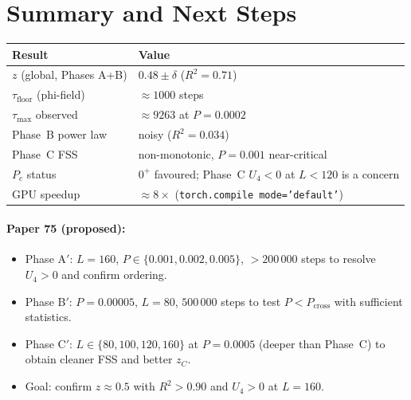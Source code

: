\documentclass[12pt,a4paper]{article}
\begin{document}
\section{Summary and Next Steps}

\begin{center}
\begin{tabular}{ll}
\toprule
\textbf{Result} & \textbf{Value} \\
\midrule
$z$ (global, Phases A+B) & $0.48 \pm \delta$ ($R^2=0.71$) \\
$\tau_\mathrm{floor}$ (phi-field) & $\approx 1000$ steps \\
$\tau_\mathrm{max}$ observed & $\approx 9263$ at $P=0.0002$ \\
Phase~B power law & noisy ($R^2=0.034$) \\
Phase~C FSS & non-monotonic, $P=0.001$ near-critical \\
$P_c$ status & $0^+$ favoured; Phase~C $U_4<0$ at $L<120$ is a concern \\
GPU speedup & $\approx 8\times$ (\texttt{torch.compile mode='default'}) \\
\bottomrule
\end{tabular}
\end{center}

\paragraph{Paper 75 (proposed):}
\begin{itemize}
  \item Phase A$'$: $L=160$, $P \in \{0.001, 0.002, 0.005\}$, $>200\,000$ steps to
        resolve $U_4 > 0$ and confirm ordering.
  \item Phase B$'$: $P=0.00005$, $L=80$, $500\,000$ steps to test $P < P_\mathrm{cross}$
        with sufficient statistics.
  \item Phase C$'$: $L \in \{80,100,120,160\}$ at $P=0.0005$ (deeper than Phase~C)
        to obtain cleaner FSS and better $z_C$.
  \item Goal: confirm $z \approx 0.5$ with $R^2 > 0.90$ and $U_4 > 0$ at $L=160$.
\end{itemize}
\end{document}

